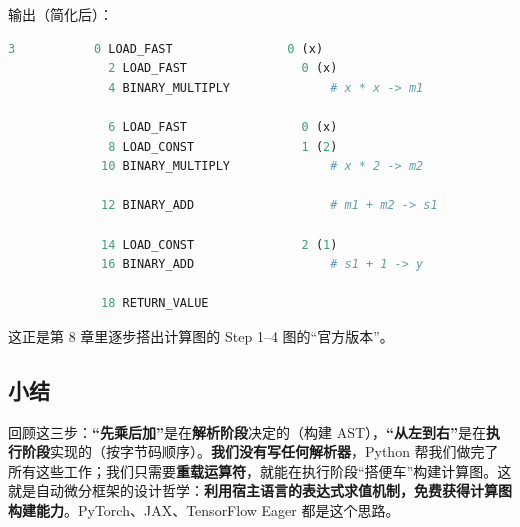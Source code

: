 输出（简化后）：

\begin{lstlisting}[style=teaching, language=Python, numbers=none]
  3           0 LOAD_FAST                0 (x)
              2 LOAD_FAST                0 (x)
              4 BINARY_MULTIPLY              # x * x -> m1

              6 LOAD_FAST                0 (x)
              8 LOAD_CONST               1 (2)
             10 BINARY_MULTIPLY              # x * 2 -> m2

             12 BINARY_ADD                   # m1 + m2 -> s1

             14 LOAD_CONST               2 (1)
             16 BINARY_ADD                   # s1 + 1 -> y

             18 RETURN_VALUE
\end{lstlisting}

这正是第 8 章里逐步搭出计算图的 Step 1--4 图的``官方版本''。

\subsection*{小结}

\begin{center}
\end{center}

回顾这三步：\textbf{``先乘后加''}是在\textbf{解析阶段}决定的（构建 AST），\textbf{``从左到右''}是在\textbf{执行阶段}实现的（按字节码顺序）。\textbf{我们没有写任何解析器}，Python 帮我们做完了所有这些工作；我们只需要\textbf{重载运算符}，就能在执行阶段``搭便车''构建计算图。这就是自动微分框架的设计哲学：\textbf{利用宿主语言的表达式求值机制，免费获得计算图构建能力}。PyTorch、JAX、TensorFlow Eager 都是这个思路。


